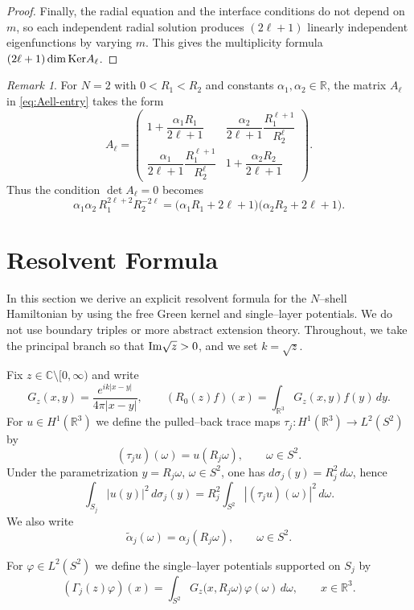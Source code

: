 \documentclass[a4paper,11pt]{article}
\numberwithin{equation}{section}
\def\re{\mathbb{R}}
\def\co{\mathbb{C}}
\renewcommand{\Im}{\text{{\rm Im}}}
\renewcommand{\ker}{\text{\rm Ker}}
\theoremstyle{definition}
\theoremstyle{remark}
\newtheorem{rem}{Remark}
\begin{document}
\begin{proof}
Finally, the radial equation and the interface conditions do not depend on $m$,
so each independent radial solution produces $(2\ell+1)$ linearly independent
eigenfunctions by varying $m$. This gives the multiplicity formula
$(2\ell+1)\dim\ker A_\ell$.
\end{proof}


\begin{rem}
For $N=2$ with $0<R_1<R_2$ and constants $\alpha_1,\alpha_2\in\mathbb R$, the
matrix $A_\ell$ in \eqref{eq:Aell-entry} takes the form
$$
A_\ell=
\left(\begin{array}{cc}
1+\dfrac{\alpha_1 R_1}{2\ell+1}
&
\dfrac{\alpha_2}{2\ell+1}\dfrac{R_1^{\ell+1}}{R_2^{\ell}}
\\[3mm]
\dfrac{\alpha_1}{2\ell+1}\dfrac{R_1^{\ell+1}}{R_2^{\ell}}
&
1+\dfrac{\alpha_2 R_2}{2\ell+1}
\end{array}\right).
$$
Thus the condition $\det A_\ell=0$ becomes
$$
\alpha_1\alpha_2\,R_1^{2\ell+2}R_2^{-2\ell}
=
\bigl(\alpha_1 R_1 + 2\ell+1\bigr)\bigl(\alpha_2 R_2 + 2\ell+1\bigr).
$$
\end{rem}





\section{Resolvent Formula}\label{sec:elem-resolvent}

In this section we derive an explicit resolvent formula for the $N$--shell
Hamiltonian by using the free Green kernel and single--layer potentials.
We do not use boundary triples or more abstract extension theory.
Throughout, we take the principal branch so that $\Im\sqrt z>0$, and we set
$k=\sqrt z$.

\medskip
Fix $z\in\co\setminus[0,\infty)$ and write
$$
G_z(x,y)=\frac{e^{ik|x-y|}}{4\pi|x-y|},\qquad
(R_0(z)f)(x)=\int_{\re^3}G_z(x,y)f(y)\,dy .
$$
For $u\in H^1(\re^3)$ we define the pulled--back trace maps
$\tau_j:H^1(\re^3)\to L^2(S^2)$ by
$$
(\tau_j u)(\omega)=u(R_j\omega),\qquad \omega\in S^2.
$$
Under the parametrization $y=R_j\omega$, $\omega\in S^2$, one has
$d\sigma_j(y)=R_j^2\,d\omega$, hence
$$
\int_{S_j}|u(y)|^2\,d\sigma_j(y)
=
R_j^2\int_{S^2}|(\tau_j u)(\omega)|^2\,d\omega.
$$
We also write
$$
\widetilde\alpha_j(\omega)=\alpha_j(R_j\omega),\qquad \omega\in S^2.
$$

For $\varphi\in L^2(S^2)$ we define the single--layer potentials supported on
$S_j$ by
\begin{equation}\label{eq:Gammaj}
(\Gamma_j(z)\varphi)(x)
=
\int_{S^2}G_z\bigl(x,R_j\omega\bigr)\,\varphi(\omega)\,d\omega,
\qquad x\in\re^3.
\end{equation}
\end{document}
